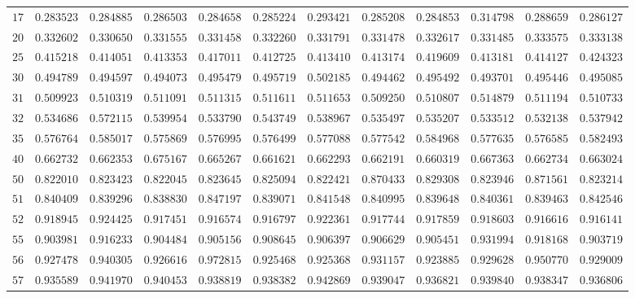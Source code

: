 \begin{sidewaystable}
\begin{tabular}{r|rrrrrrrrrrr}
$17$ & $0.283523$ & $0.284885$ & $0.286503$ & $0.284658$ & $0.285224$ & $0.293421$ & $0.285208$ & $0.284853$ & $0.314798$ & $0.288659$ & $0.286127$ \\
$20$ & $0.332602$ & $0.330650$ & $0.331555$ & $0.331458$ & $0.332260$ & $0.331791$ & $0.331478$ & $0.332617$ & $0.331485$ & $0.333575$ & $0.333138$ \\
$25$ & $0.415218$ & $0.414051$ & $0.413353$ & $0.417011$ & $0.412725$ & $0.413410$ & $0.413174$ & $0.419609$ & $0.413181$ & $0.414127$ & $0.424323$ \\
$30$ & $0.494789$ & $0.494597$ & $0.494073$ & $0.495479$ & $0.495719$ & $0.502185$ & $0.494462$ & $0.495492$ & $0.493701$ & $0.495446$ & $0.495085$ \\
$31$ & $0.509923$ & $0.510319$ & $0.511091$ & $0.511315$ & $0.511611$ & $0.511653$ & $0.509250$ & $0.510807$ & $0.514879$ & $0.511194$ & $0.510733$ \\
$32$ & $0.534686$ & $0.572115$ & $0.539954$ & $0.533790$ & $0.543749$ & $0.538967$ & $0.535497$ & $0.535207$ & $0.533512$ & $0.532138$ & $0.537942$ \\
$35$ & $0.576764$ & $0.585017$ & $0.575869$ & $0.576995$ & $0.576499$ & $0.577088$ & $0.577542$ & $0.584968$ & $0.577635$ & $0.576585$ & $0.582493$ \\
$40$ & $0.662732$ & $0.662353$ & $0.675167$ & $0.665267$ & $0.661621$ & $0.662293$ & $0.662191$ & $0.660319$ & $0.667363$ & $0.662734$ & $0.663024$ \\
$50$ & $0.822010$ & $0.823423$ & $0.822045$ & $0.823645$ & $0.825094$ & $0.822421$ & $0.870433$ & $0.829308$ & $0.823946$ & $0.871561$ & $0.823214$ \\
$51$ & $0.840409$ & $0.839296$ & $0.838830$ & $0.847197$ & $0.839071$ & $0.841548$ & $0.840995$ & $0.839648$ & $0.840361$ & $0.839463$ & $0.842546$ \\
$52$ & $0.918945$ & $0.924425$ & $0.917451$ & $0.916574$ & $0.916797$ & $0.922361$ & $0.917744$ & $0.917859$ & $0.918603$ & $0.916616$ & $0.916141$ \\
$55$ & $0.903981$ & $0.916233$ & $0.904484$ & $0.905156$ & $0.908645$ & $0.906397$ & $0.906629$ & $0.905451$ & $0.931994$ & $0.918168$ & $0.903719$ \\
$56$ & $0.927478$ & $0.940305$ & $0.926616$ & $0.972815$ & $0.925468$ & $0.925368$ & $0.931157$ & $0.923885$ & $0.929628$ & $0.950770$ & $0.929009$ \\
$57$ & $0.935589$ & $0.941970$ & $0.940453$ & $0.938819$ & $0.938382$ & $0.942869$ & $0.939047$ & $0.936821$ & $0.939840$ & $0.938347$ & $0.936806$ \\

\end{tabular}
\end{sidewaystable}
